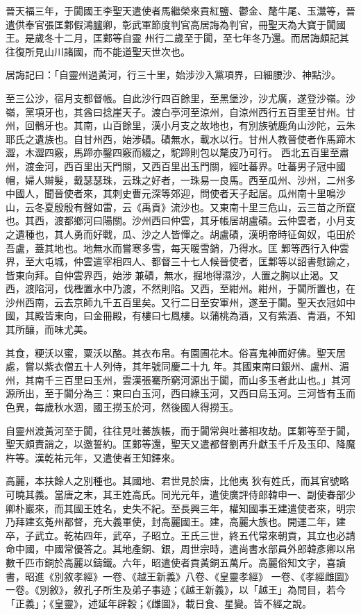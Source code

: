 \begin{pinyinscope}
 晉天福三年，于闐國王李聖天遣使者馬繼榮來貢紅鹽、鬱金、氂牛尾、玉灊等，晉遣供奉官張匡鄴假鴻臚卿，彰武軍節度判官高居誨為判官，冊聖天為大寶于闐國王。是歲冬十二月，匡鄴等自靈
 州行二歲至于闐，至七年冬乃還。而居誨頗記其往復所見山川諸國，而不能道聖天世次也。



 居誨記曰：「自靈州過黃河，行三十里，始涉沙入黨項界，曰細腰沙、神點沙。



 至三公沙，宿月支都督帳。自此沙行四百餘里，至黑堡沙，沙尤廣，遂登沙嶺。沙嶺，黨項牙也，其酋曰捻崖天子。渡白亭河至涼州，自涼州西行五百里至甘州。甘州，回鶻牙也。其南，山百餘里，漢小月支之故地也，有別族號鹿角山沙陀，云朱耶氏之遺族也。自甘州西，始涉磧。磧無水，載水以行。甘州人教晉使者作馬蹄木澀，木澀四竅，馬蹄亦鑿四竅而綴之，駝蹄則包以氂皮乃可行。
 西北五百里至肅州，渡金河，西百里出天門關，又西百里出玉門關，經吐蕃界。吐蕃男子冠中國帽，婦人辮髮，戴瑟瑟珠，云珠之好者，一珠易一良馬。西至瓜州、沙州，二州多中國人，聞晉使者來，其刺史曹元深等郊迎，問使者天子起居。瓜州南十里鳴沙山，云冬夏殷殷有聲如雷，云《禹貢》流沙也。又東南十里三危山，云三苗之所竄也。其西，渡都鄉河曰陽關。沙州西曰仲雲，其牙帳居胡盧磧。云仲雲者，小月支之遺種也，其人勇而好戰，瓜、沙之人皆憚之。胡盧磧，漢明帝時征匈奴，屯田於吾盧，蓋其地也。地無水而嘗寒多雪，每天暖雪銷，乃得水。匡
 鄴等西行入仲雲界，至大屯城，仲雲遣宰相四人、都督三十七人候晉使者，匡鄴等以詔書慰諭之，皆東向拜。自仲雲界西，始涉兼磧，無水，掘地得濕沙，人置之胸以止渴。又西，渡陷河，伐檉置水中乃渡，不然則陷。又西，至紺州。紺州，于闐所置也，在沙州西南，云去京師九千五百里矣。又行二日至安軍州，遂至于闐。聖天衣冠如中國，其殿皆東向，曰金冊殿，有樓曰七鳳樓。以蒲桃為酒，又有紫酒、青酒，不知其所釀，而味尤美。



 其食，粳沃以蜜，粟沃以酪。其衣布帛。有園圃花木。俗喜鬼神而好佛。聖天居處，嘗以紫衣僧五十人列侍，其年號同慶二十九
 年。其國東南曰銀州、盧州、湄州，其南千三百里曰玉州，雲漢張騫所窮河源出于闐，而山多玉者此山也。」其河源所出，至于闐分為三：東曰白玉河，西曰綠玉河，又西曰烏玉河。三河皆有玉而色異，每歲秋水涸，國王撈玉於河，然後國人得撈玉。



 自靈州渡黃河至于闐，往往見吐蕃族帳，而于闐常與吐蕃相攻劫。匡鄴等至于闐，聖天頗責誚之，以邀誓約。匡鄴等還，聖天又遣都督劉再升獻玉千斤及玉印、降魔杵等。漢乾祐元年，又遣使者王知鐸來。



 高麗，本扶餘人之別種也。其國地、君世見於唐，比他夷
 狄有姓氏，而其官號略可曉其義。當唐之末，其王姓高氏。同光元年，遣使廣評侍郎韓申一、副使春部少卿朴巖來，而其國王姓名，史失不紀。至長興三年，權知國事王建遣使者來，明宗乃拜建玄菟州都督，充大義軍使，封高麗國王。建，高麗大族也。開運二年，建卒，子武立。乾祐四年，武卒，子昭立。王氏三世，終五代常來朝貢，其立也必請命中國，中國常優答之。其地產銅、銀，周世宗時，遣尚書水部員外郎韓彥卿以帛數千匹市銅於高麗以鑄鐵。六年，昭遣使者貢黃銅五萬斤。高麗俗知文字，喜讀書，昭進《別敘孝經》一卷、《越王新義》八卷、《皇靈孝經》
 一卷、《孝經雌圖》一卷。《別敘》，敘孔子所生及弟子事迹；《越王新義》，以「越王」為問目，若今「正義」；《皇靈》，述延年辟穀；《雌圖》，載日食、星變。皆不經之說。




\end{pinyinscope}
